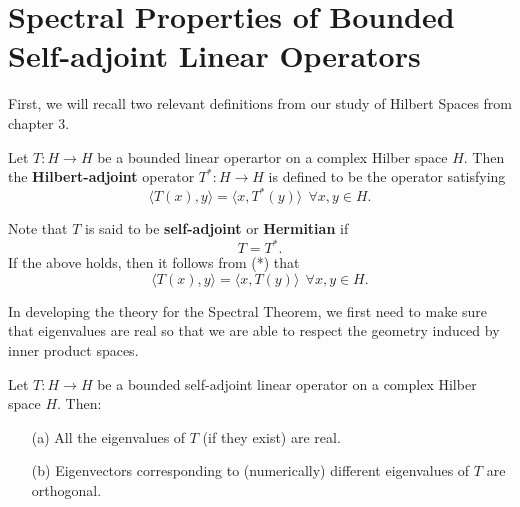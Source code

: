 \section{Spectral Properties of Bounded Self-adjoint Linear Operators}
First, we will recall two relevant definitions from our study of Hilbert Spaces from chapter 3.

\begin{definition}
    Let \( T: H \to H  \) be a bounded linear operartor on  a complex Hilber space \( H  \). Then the \textbf{Hilbert-adjoint} operator \( T^{*} : H \to H  \) is defined to be the operator satisfying
    \[  \langle T(x) , y \rangle = \langle x ,  T^{*}(y) \rangle \ \ \forall x,y \in H. \tag{*}  \]
\end{definition}

Note that \( T  \) is said to be \textbf{self-adjoint} or \textbf{Hermitian} if 
\[  T = T^{*}. \]
If the above holds, then it follows from (*) that 
\[ \langle T(x) , y \rangle = \langle x  ,  T(y) \rangle \ \ \forall  x,y \in H.\]

In developing the theory for the Spectral Theorem, we first need to make sure that eigenvalues are real so that we are able to respect the geometry induced by inner product spaces.
\begin{theorem}
    Let \( T: H \to H  \) be a bounded self-adjoint linear operator on a complex Hilber space \( H  \). Then:
    \begin{enumerate}
        \item[(a)] All the eigenvalues of \( T  \) (if they exist) are real.
        \item[(b)] Eigenvectors corresponding to (numerically) different eigenvalues of \( T  \) are orthogonal.
    \end{enumerate}
\end{theorem}

